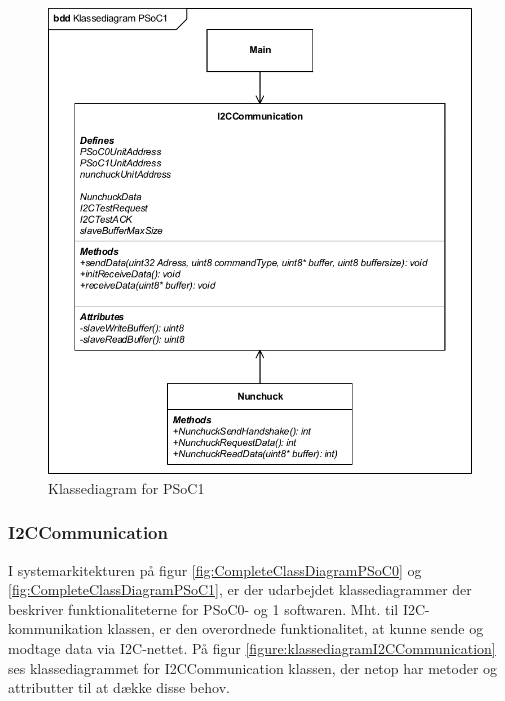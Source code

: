 \begin{figure}[H]
	\centering
	\includegraphics[width=\textwidth]{DesignOgImplementering/images/PSoC1KlassediagramOversigt.pdf}
	\caption{Klassediagram for PSoC1}
	\label{figure:klassediagramPSoC1}
\end{figure}

\subsubsection{I2CCommunication}
I systemarkitekturen på figur \ref{fig:CompleteClassDiagramPSoC0} og \ref{fig:CompleteClassDiagramPSoC1}, er der udarbejdet klassediagrammer der beskriver funktionaliteterne for PSoC0- og 1 softwaren. Mht. til I2C-kommunikation klassen, er den overordnede funktionalitet, at kunne sende og modtage data via I2C-nettet. På figur \ref{figure:klassediagramI2CCommunication} ses klassediagrammet for I2CCommunication klassen, der netop har metoder og attributter til at dække disse behov.


